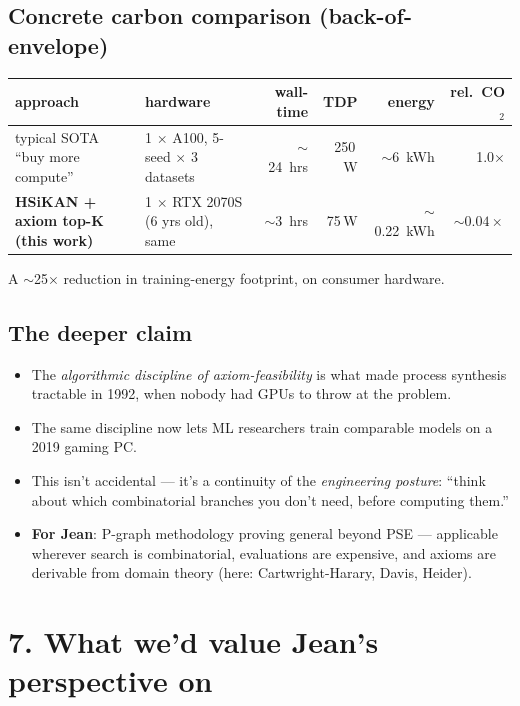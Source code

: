\documentclass[11pt,a4paper]{article}
\begin{document}
\subsection*{Concrete carbon comparison (back-of-envelope)}

\begin{center}
\begin{tabular}{l l r r r r}
\toprule
approach                                  & hardware               & wall-time     & TDP    & energy   & rel.\ CO$_2$ \\
\midrule
typical SOTA ``buy more compute''         & 1 $\times$ A100, 5-seed $\times$ 3 datasets    & $\sim$24~hrs  & 250\,W  & $\sim$6~kWh  & 1.0$\times$ \\
\textbf{HSiKAN + axiom top-K (this work)} & 1 $\times$ RTX 2070S (6 yrs old), same         & $\sim$3~hrs   & 75\,W   & $\sim$0.22~kWh & $\mathbf{\sim 0.04 \times}$ \\
\bottomrule
\end{tabular}
\end{center}

A $\sim$25$\times$ reduction in training-energy footprint, on
consumer hardware.

\subsection*{The deeper claim}

\begin{itemize}
\item The \emph{algorithmic discipline of axiom-feasibility} is what
      made process synthesis tractable in 1992, when nobody had GPUs
      to throw at the problem.
\item The same discipline now lets ML researchers train comparable
      models on a 2019 gaming PC.
\item This isn't accidental --- it's a continuity of the
      \emph{engineering posture}: ``think about which combinatorial
      branches you don't need, before computing them.''
\item \textbf{For Jean}: P-graph methodology proving general beyond
      PSE --- applicable wherever search is combinatorial,
      evaluations are expensive, and axioms are derivable from
      domain theory (here: Cartwright-Harary, Davis, Heider).
\end{itemize}

\section*{7. What we'd value Jean's perspective on}
\end{document}
